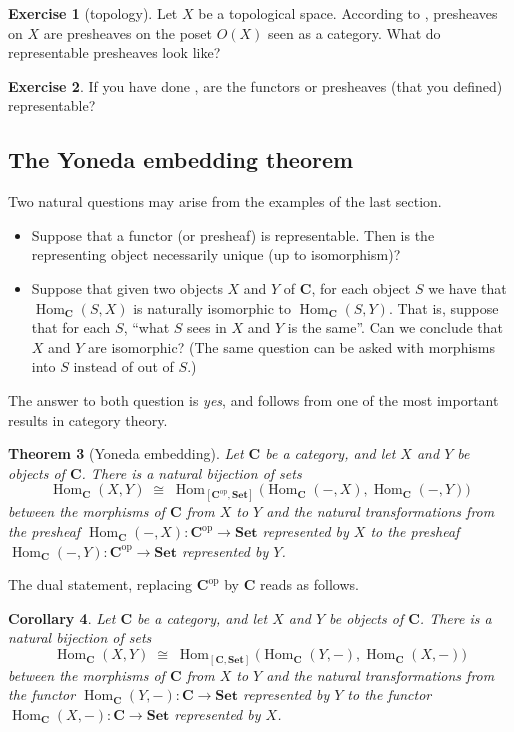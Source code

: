\documentclass[12pt,oneside,headings=small]{scrbook}
\numberwithin{equation}{section}
\theoremstyle{plain}
\newtheorem{thm}{Theorem}[section]
\newtheorem{cor}[thm]{Corollary}
\theoremstyle{definition}
\newtheorem{ex}[thm]{Exercise}
\DeclareMathOperator{\Hom}{Hom}
\newcommand{\cat}[1]{{\mathbf{#1}}} %
\newcommand{\op}{\mathrm{op}} %
\newcommand{\Set}{\cat{Set}}
\DeclareMathOperator{\1}{\mathbbm{1}}
\DeclareMathOperator{\2}{\mathbbm{2}}
\begin{document}
\begin{ex}[topology]\label{repronopen}
 Let $X$ be a topological space. According to , presheaves on $X$ are presheaves on the poset $O(X)$ seen as a category. What do representable presheaves look like?
\end{ex}

\begin{ex}
 If you have done , are the functors or presheaves (that you defined) representable?
\end{ex}


\subsection{The Yoneda embedding theorem}

Two natural questions may arise from the examples of the last section. 
\begin{itemize}
 \item Suppose that a functor (or presheaf) is representable. Then is the representing object necessarily unique (up to isomorphism)?
 \item Suppose that given two objects $X$ and $Y$ of $\cat{C}$, for each object $S$ we have that $\Hom_\cat{C}(S,X)$ is naturally isomorphic to $\Hom_\cat{C}(S,Y)$. That is, suppose that for each $S$, ``what $S$ sees in $X$ and $Y$ is the same''. Can we conclude that $X$ and $Y$ are isomorphic?
 (The same question can be asked with morphisms into $S$ instead of out of $S$.)
\end{itemize}

The answer to both question is \emph{yes}, and follows from one of the most important results in category theory.


\begin{thm}[Yoneda embedding]\label{yonedathm}
 Let $\cat{C}$ be a category, and let $X$ and $Y$ be objects of $\cat{C}$. There is a natural bijection of sets 
 $$
 \Hom_\cat{C} (X,Y) \; \cong \; \Hom_{[\cat{C}^\op,\Set]} \big( \Hom_\cat{C} (-,X) , \Hom_\cat{C} (-,Y) \big)
 $$
 between the morphisms of $\cat{C}$ from $X$ to $Y$ and the natural transformations from the presheaf $\Hom_\cat{C} (-,X):\cat{C}^\op\to\Set$ represented by $X$ to the presheaf $\Hom_\cat{C} (-,Y):\cat{C}^\op\to\Set$ represented by $Y$.
\end{thm}

The dual statement, replacing $\cat{C}^\op$ by $\cat{C}$ reads as follows. 
\begin{cor}
 Let $\cat{C}$ be a category, and let $X$ and $Y$ be objects of $\cat{C}$. There is a natural bijection of sets 
 $$
 \Hom_\cat{C} (X,Y) \; \cong \; \Hom_{[\cat{C},\Set]} \big( \Hom_\cat{C} (Y,-) , \Hom_\cat{C} (X,-) \big)
 $$
 between the morphisms of $\cat{C}$ from $X$ to $Y$ and the natural transformations from the functor $\Hom_\cat{C} (Y,-):\cat{C}\to\Set$ represented by $Y$ to the functor $\Hom_\cat{C} (X,-):\cat{C}\to\Set$ represented by $X$.
\end{cor}
\end{document}
